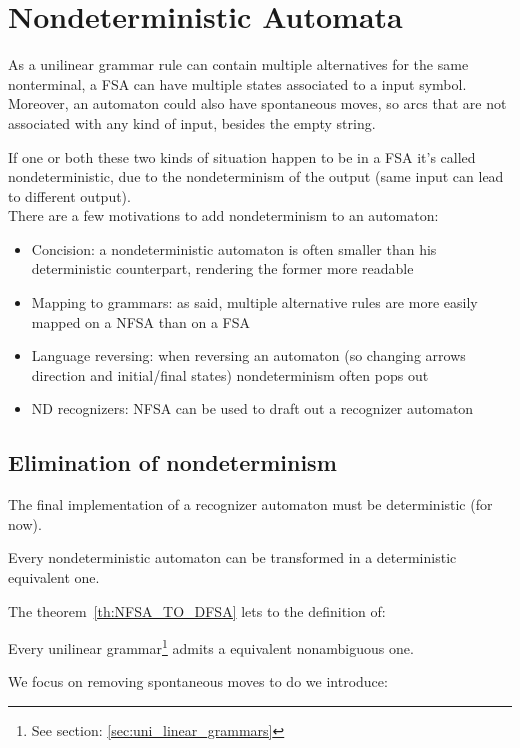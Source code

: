 	\section{Nondeterministic Automata}
		As a unilinear grammar rule can contain multiple alternatives for the same nonterminal, a FSA can have multiple states associated to a input symbol.
		Moreover, an automaton could also have spontaneous moves, so arcs that are not associated with any kind of input, besides the empty string.
		
		If one or both these two kinds of situation happen to be in a FSA it's called nondeterministic, due to the nondeterminism of the output (same input can lead to different output).\\
		There are a few motivations to add nondeterminism to an automaton:
		\begin{itemize}
			\item Concision: a nondeterministic automaton is often smaller than his deterministic counterpart, rendering the former more readable
			\item Mapping to grammars: as said, multiple alternative rules are more easily mapped on a NFSA than on a FSA
			\item Language reversing: when reversing an automaton (so changing arrows direction and initial/final states) nondeterminism often pops out
			\item ND recognizers: NFSA can be used to draft out a recognizer automaton
		\end{itemize}
		\subsection{Elimination of nondeterminism}
			The final implementation of a recognizer automaton must be deterministic (for now).
			\begin{theorem}\label{th:NFSA_TO_DFSA}
				Every nondeterministic automaton can be transformed in a deterministic equivalent one.
			\end{theorem}
			The theorem~\ref{th:NFSA_TO_DFSA} lets to the definition of:
			\begin{corollary}
				Every unilinear grammar\footnote{See section: \ref{sec:uni_linear_grammars}}  admits a equivalent nonambiguous one.
			\end{corollary}
			We focus on removing spontaneous moves to do we introduce:
